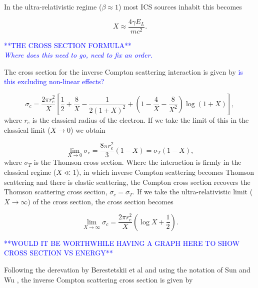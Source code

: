 \documentclass[../main.tex]{subfiles}
\begin{document}
In the ultra-relativistic regime ($\beta \approx 1$) most ICS sources inhabit this becomes

\begin{equation}
X \approx \frac{4\gamma E_{L}}{mc^{2}}.
\label{eq:recoil_term_ultrarelativistic}    
\end{equation}

\textcolor{blue}{**THE CROSS SECTION FORMULA** \\ \textit{Where does this need to go, need to fix an order.}}

The cross section for the inverse Compton scattering interaction \cite{landau1982course} is given by \textcolor{blue}{is this excluding non-linear effects?}

\begin{equation}
 \sigma_{c} = \frac{2\pi r_{e}^{2}}{X}\left[\frac{1}{2}+\frac{8}{X}-\frac{1}{2\left(1+X\right)^{2}}+\left(1-\frac{4}{X}-\frac{8}{X^{2}}\right)\log{\left(1+X\right)}\right],
 \label{eq:compton_cross_section}
\end{equation}
where $r_{e}$ is the classical radius of the electron. If we take the limit of this in the classical limit ($X \to 0$) we obtain

\begin{equation}
\lim_{X \to 0} \sigma_{c} = \frac{8\pi r_{e}^{2}}{3}\left(1-X\right) = \sigma_{T}\left(1-X\right),
\label{eq:compton_cross_section_classical_limit}
\end{equation}
where $\sigma_{T}$ is the Thomson cross section. Where the interaction is firmly in the classical regime ($X \ll 1$), in which inverse Compton scattering becomes Thomson scattering and there is elastic scattering, the Compton cross section recovers the Thomson scattering cross section, $\sigma_{c} = \sigma_{T}$. If we take the ultra-relativistic limit ($X \to \infty$) of the cross section, the cross section becomes

\begin{equation}
\lim_{X \to \infty} \sigma_{c} = \frac{2\pi r_{e}^{2}}{X}\left(\log{X}+\frac{1}{2}\right).
\label{eq:compton_cross_section_ultrarelativistic_limit}
\end{equation}

\textcolor{blue}{**WOULD IT BE WORTHWHILE HAVING A GRAPH HERE TO SHOW CROSS SECTION VS ENERGY**}

Following the derevation by Berestetskii et al \cite{landau1982course} and using the notation of Sun and Wu \cite{sun2011theoretical}, the inverse Compton scattering cross section is given by
\end{document}
